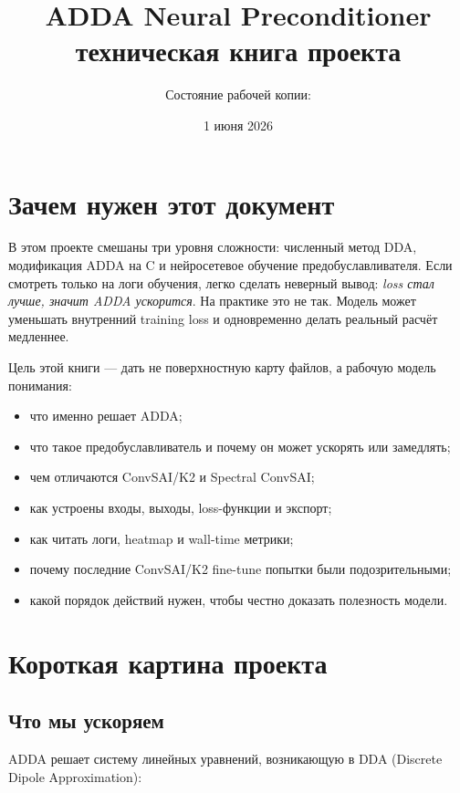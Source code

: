 \documentclass[11pt,a4paper,oneside]{book}
\title{
  \Huge ADDA Neural Preconditioner\\
  \Large техническая книга проекта
}
\author{Состояние рабочей копии: \code{convsai-universal}}
\date{1 июня 2026}
\begin{document}
\frontmatter
\maketitle
\tableofcontents

\chapter*{Зачем нужен этот документ}

В этом проекте смешаны три уровня сложности: численный метод DDA, модификация
ADDA на C и нейросетевое обучение предобуславливателя. Если смотреть только на
логи обучения, легко сделать неверный вывод: \emph{loss стал лучше, значит
ADDA ускорится}. На практике это не так. Модель может уменьшать внутренний
training loss и одновременно делать реальный расчёт медленнее.

Цель этой книги --- дать не поверхностную карту файлов, а рабочую модель
понимания:

\begin{itemize}[leftmargin=2em]
  \item что именно решает ADDA;
  \item что такое предобуславливатель и почему он может ускорять или замедлять;
  \item чем отличаются ConvSAI/K2 и Spectral ConvSAI;
  \item как устроены входы, выходы, loss-функции и экспорт;
  \item как читать логи, heatmap и wall-time метрики;
  \item почему последние ConvSAI/K2 fine-tune попытки были подозрительными;
  \item какой порядок действий нужен, чтобы честно доказать полезность модели.
\end{itemize}

\mainmatter

\chapter{Короткая картина проекта}

\section{Что мы ускоряем}

ADDA решает систему линейных уравнений, возникающую в DDA
(\foreignlanguage{english}{Discrete Dipole Approximation}):
\end{document}
